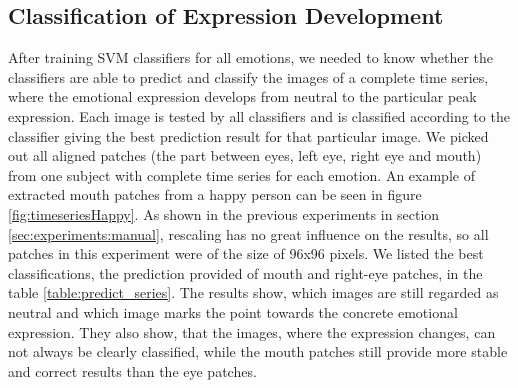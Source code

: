 \subsection{Classification of Expression Development}\label{sec:experiments:timeseries}
After training SVM classifiers for all emotions, we needed to know whether the classifiers are able to predict and classify the images of a complete time series, where the emotional expression develops from neutral to the particular peak expression. Each image is tested by all classifiers and is classified according to the classifier giving the best prediction result for that particular image. We picked out all aligned patches (the part between eyes, left eye, right eye and mouth) from one subject with complete time series for each emotion. An example of extracted mouth patches from a happy person can be seen in figure \ref{fig:timeseriesHappy}. As shown in the previous experiments in section \ref{sec:experiments:manual}, rescaling has no great influence on the results, so all patches in this experiment were of the size of 96x96 pixels. We listed the best classifications, the prediction provided of mouth and right-eye patches, in the table \ref{table:predict_series}. The results show, which images are still regarded as neutral and which image marks the point towards the concrete emotional expression. They also show, that the images, where the expression changes, can not always be clearly classified, while the mouth patches still provide more stable and correct results than the eye patches.

